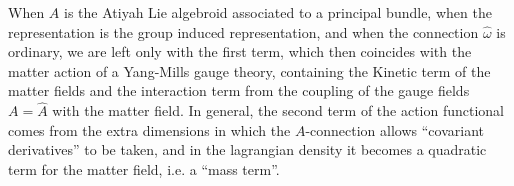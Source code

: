 When $A$ is the Atiyah Lie algebroid associated to a principal bundle, when the representation is the group induced representation, and when the connection $\hat \omega$ is ordinary, we are left only with the first term, which then coincides with the matter action of a Yang-Mills gauge theory, containing the Kinetic term of the matter fields and the interaction term from the coupling of the gauge fields $A = \hat A$ with the matter field. In general, the second term of the action functional comes from the extra dimensions in which the $A$-connection allows ``covariant derivatives'' to be taken, and in the lagrangian density it becomes a quadratic term for the matter field, i.e. a ``mass term''.